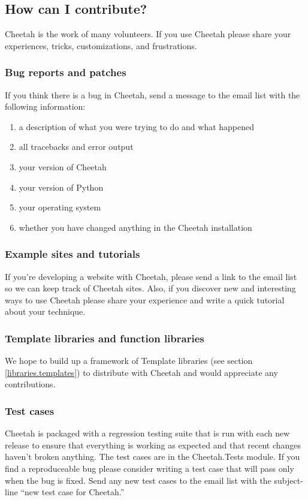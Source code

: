 \subsection{How can I contribute?}
\label{intro.contribute}

Cheetah is the work of many volunteers.  If you use Cheetah please share your
experiences, tricks, customizations, and frustrations.

\subsubsection{Bug reports and patches}

If you think there is a bug in Cheetah, send a message to the email list
with the following information:

\begin{enumerate}
\item a description of what you were trying to do and what happened
\item all tracebacks and error output
\item your version of Cheetah
\item your version of Python
\item your operating system
\item whether you have changed anything in the Cheetah installation
\end{enumerate}

\subsubsection{Example sites and tutorials}
If you're developing a website with Cheetah, please send a link to the
email list so we can keep track of Cheetah sites.  Also, if you discover
new and interesting ways to use Cheetah please share your experience and
write a quick tutorial about your technique.

\subsubsection{Template libraries and function libraries}
We hope to build up a framework of Template libraries (see section
\ref{libraries.templates}) to distribute with Cheetah and would appreciate any
contributions.

\subsubsection{Test cases}
Cheetah is packaged with a regression testing suite that is run with each
new release to ensure that everything is working as expected and that recent
changes haven't broken anything.  The test cases are in the Cheetah.Tests
module.  If you find a reproduceable bug please consider writing a test case
that will pass only when the bug is fixed.  Send any new test cases to the email
list with the subject-line ``new test case for Cheetah.''

